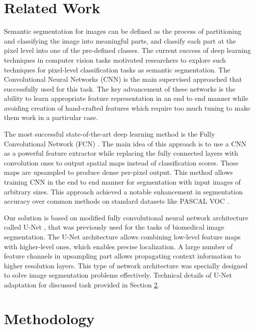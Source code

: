 \documentclass[10pt,twocolumn,letterpaper]{article}
\begin{document}
\section{Related Work}
\label{section:related_work}
Semantic segmentation for images can be defined as the process of partitioning and classifying the image into meaningful parts, and classify each part at the pixel level into one of the pre-defined classes. The current success of deep learning techniques in computer vision tasks motivated researchers to explore such techniques for pixel-level classification tasks as semantic segmentation. The Convolutional Neural Networks (CNN) is the main supervised approached that successfully used for this task. The key advancement of these networks is the ability to learn appropriate feature representation in an end to end manner while avoiding creation of hand-crafted features which require too much tuning to make them work in a particular case.

The most successful state-of-the-art deep learning method is the Fully Convolutional Network (FCN) \cite{fcn}.  The main idea of this approach is to use a CNN as a powerful feature extractor while replacing the fully connected layers with convolution ones to output spatial maps instead of classification scores. Those maps are upsampled to produce dense per-pixel output. This method allows training CNN in the end to end manner for segmentation with input images of arbitrary sizes. This approach achieved a notable enhancement in segmentation accuracy over common methods on standard datasets like PASCAL VOC \cite{pascal}.

Our solution is based on modified fully convolutional neural network architecture called U-Net  \cite{unet}, that was previously used for the tasks of biomedical image segmentation. The U-Net architecture allows combining low-level feature maps with higher-level ones, which enables precise localization.  A large number of feature channels in upsampling part allows propagating context information to higher resolution layers.  This type of network architecture was specially designed to solve image segmentation problems effectively. Technical details of U-Net adaptation for discussed task provided in Section \ref{section:methods}.

\section{Methodology}
\label{section:methods}
\end{document}
